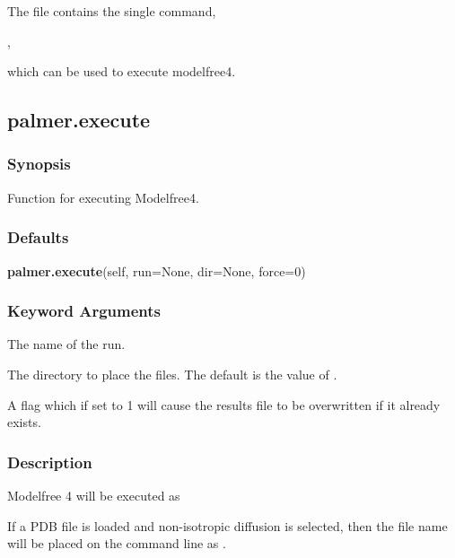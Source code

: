  The file  contains the single command, 
  

 , 
  

 which can be used to execute modelfree4. 
  

  

 \newpage 

 \subsection{palmer.execute} 

  
 \subsubsection{Synopsis} 

 Function for executing Modelfree4. 
  

  
 \subsubsection{Defaults} 

 \textsf{\textbf{palmer.execute}(self, run=None, dir=None, force=0)} 

  
 \subsubsection{Keyword Arguments} 

   The name of the run.   

   The directory to place the files.  The default is the value of .   

   A flag which if set to 1 will cause the results file to be overwritten if it already exists.  

  

  
 \subsubsection{Description} 

 Modelfree 4 will be executed as 
  


 If a PDB file is loaded and non-isotropic diffusion is selected, then the file name will be placed on the command line as . 
  

